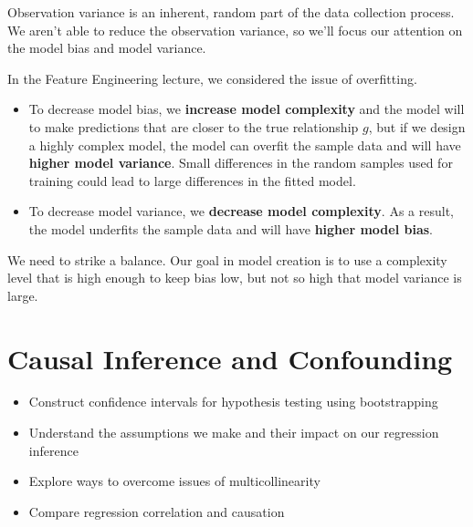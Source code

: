 \documentclass[
  letterpaper,
  DIV=11,
  numbers=noendperiod]{scrreprt}
\providecommand{\tightlist}{%
  \setlength{\itemsep}{0pt}\setlength{\parskip}{0pt}}\usepackage{longtable,booktabs,array}
\begin{document}
Observation variance is an inherent, random part of the data collection
process. We aren't able to reduce the observation variance, so we'll
focus our attention on the model bias and model variance.

In the Feature Engineering lecture, we considered the issue of
overfitting.

\begin{itemize}
\item
  To decrease model bias, we \textbf{increase model complexity} and the
  model will to make predictions that are closer to the true
  relationship \(g\), but if we design a highly complex model, the model
  can overfit the sample data and will have \textbf{higher model
  variance}. Small differences in the random samples used for training
  could lead to large differences in the fitted model.
\item
  To decrease model variance, we \textbf{decrease model complexity}. As
  a result, the model underfits the sample data and will have
  \textbf{higher model bias}.
\end{itemize}

We need to strike a balance. Our goal in model creation is to use a
complexity level that is high enough to keep bias low, but not so high
that model variance is large.


\chapter{Causal Inference and
Confounding}\label{causal-inference-and-confounding}

\begin{tcolorbox}[enhanced jigsaw, colback=white, arc=.35mm, toprule=.15mm, colframe=quarto-callout-note-color-frame, coltitle=black, opacitybacktitle=0.6, breakable, titlerule=0mm, leftrule=.75mm, left=2mm, opacityback=0, bottomtitle=1mm, rightrule=.15mm, colbacktitle=quarto-callout-note-color!10!white, bottomrule=.15mm, title=\textcolor{quarto-callout-note-color}{\faInfo}\hspace{0.5em}{Learning Outcomes}, toptitle=1mm]

\begin{itemize}
\tightlist
\item
  Construct confidence intervals for hypothesis testing using
  bootstrapping
\item
  Understand the assumptions we make and their impact on our regression
  inference
\item
  Explore ways to overcome issues of multicollinearity
\item
  Compare regression correlation and causation
\end{itemize}

\end{tcolorbox}
\end{document}
